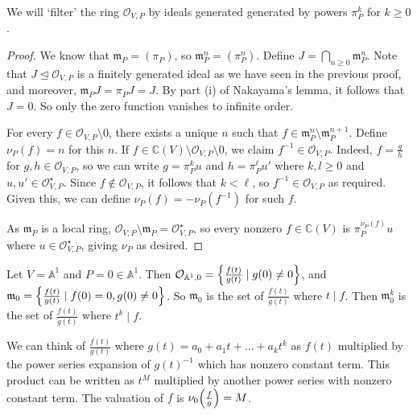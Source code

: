 We will `filter' the ring \( \mathcal O_{V,P} \) by ideals generated generated by powers \( \pi_P^k \) for \( k \geq 0 \).
\begin{proof}
    We know that \( \mathfrak m_P = (\pi_P) \), so \( \mathfrak m_P^n = (\pi_P^n) \).
    Define \( J = \bigcap_{n \geq 0} \mathfrak m_P^n \).
    Note that \( J \trianglelefteq \mathcal O_{V,P} \) is a finitely generated ideal as we have seen in the previous proof, and moreover, \( \mathfrak m_P J = \pi_P J = J \).
    By part (i) of Nakayama's lemma, it follows that \( J = 0 \).
    So only the zero function vanishes to infinite order.

    For every \( f \in \mathcal O_{V,P} \setminus \qty{0} \), there exists a unique \( n \) such that \( f \in \mathfrak m_P^n \setminus \mathfrak m_P^{n+1} \).
    Define \( \nu_P(f) = n \) for this \( n \).
    If \( f \in \mathbb C(V) \setminus \mathcal O_{V,P} \setminus \qty{0} \), we claim \( f^{-1} \in \mathcal O_{V,P} \).
    Indeed, \( f = \frac{g}{h} \) for \( g, h \in \mathcal O_{V,P} \), so we can write \( g = \pi_P^k u \) and \( h = \pi_P^\ell u' \) where \( k, l \geq 0 \) and \( u, u' \in \mathcal O_{V,P}^\star \).
    Since \( f \not\in \mathcal O_{V,P} \), it follows that \( k < \ell \), so \( f^{-1} \in \mathcal O_{V,P} \) as required.
    Given this, we can define \( \nu_P(f) = -\nu_P(f^{-1}) \) for such \( f \).

    As \( \mathfrak m_P \) is a local ring, \( \mathcal O_{V,P} \setminus \mathfrak m_P = \mathcal O_{V,P}^\star \), so every nonzero \( f \in \mathbb C(V) \) is \( \pi_P^{\nu_P(f)} u \) where \( u \in \mathcal O_{V,P}^\star \), giving \( \nu_P \) as desired.
\end{proof}
\begin{example}
    Let \( V = \mathbb A^1 \) and \( P = 0 \in \mathbb A^1 \).
    Then \( \mathcal O_{\mathbb A^1,0} = \qty{\frac{f(t)}{g(t)} \mid g(0) \neq 0} \), and \( \mathfrak m_0 = \qty{\frac{f(t)}{g(t)} \mid f(0) = 0, g(0) \neq 0} \).
    So \( \mathfrak m_0 \) is the set of \( \frac{f(t)}{g(t)} \) where \( t \mid f \).
    Then \( \mathfrak m_0^k \) is the set of \( \frac{f(t)}{g(t)} \) where \( t^k \mid f \).

    We can think of \( \frac{f(t)}{g(t)} \) where \( g(t) = a_0 + a_1t + \dots + a_k t^k \) as \( f(t) \) multiplied by the power series expansion of \( g(t)^{-1} \) which has nonzero constant term.
    This product can be written as \( t^M \) multiplied by another power series with nonzero constant term.
    The valuation of \( f \) is \( \nu_0\qty(\frac{f}{g}) = M \).
\end{example}
